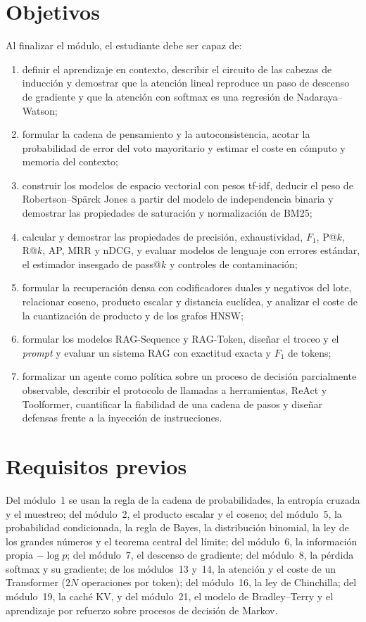 \documentclass[11pt,a4paper,twoside,openany]{book}
\begin{document}
\section*{Objetivos}
Al finalizar el módulo, el estudiante debe ser capaz de:
\begin{enumerate}[label=\arabic*.]
  \item definir el aprendizaje en contexto, describir el circuito de las cabezas de inducción y demostrar que la atención lineal reproduce un paso de descenso de gradiente y que la atención con softmax es una regresión de Nadaraya--Watson;
  \item formular la cadena de pensamiento y la autoconsistencia, acotar la probabilidad de error del voto mayoritario y estimar el coste en cómputo y memoria del contexto;
  \item construir los modelos de espacio vectorial con pesos tf-idf, deducir el peso de Robertson--Spärck Jones a partir del modelo de independencia binaria y demostrar las propiedades de saturación y normalización de BM25;
  \item calcular y demostrar las propiedades de precisión, exhaustividad, $F_1$, P@$k$, R@$k$, AP, MRR y nDCG, y evaluar modelos de lenguaje con errores estándar, el estimador insesgado de pass@$k$ y controles de contaminación;
  \item formular la recuperación densa con codificadores duales y negativos del lote, relacionar coseno, producto escalar y distancia euclídea, y analizar el coste de la cuantización de producto y de los grafos HNSW;
  \item formular los modelos RAG-Sequence y RAG-Token, diseñar el troceo y el \emph{prompt} y evaluar un sistema RAG con exactitud exacta y $F_1$ de tokens;
  \item formalizar un agente como política sobre un proceso de decisión parcialmente observable, describir el protocolo de llamadas a herramientas, ReAct y Toolformer, cuantificar la fiabilidad de una cadena de pasos y diseñar defensas frente a la inyección de instrucciones.
\end{enumerate}

\section*{Requisitos previos}
Del módulo~1 se usan la regla de la cadena de probabilidades, la entropía cruzada y el muestreo; del módulo~2, el producto escalar y el coseno; del módulo~5, la probabilidad condicionada, la regla de Bayes, la distribución binomial, la ley de los grandes números y el teorema central del límite; del módulo~6, la información propia $-\log p$; del módulo~7, el descenso de gradiente; del módulo~8, la pérdida softmax y su gradiente; de los módulos~13 y~14, la atención y el coste de un Transformer ($2N$ operaciones por token); del módulo~16, la ley de Chinchilla; del módulo~19, la caché KV, y del módulo~21, el modelo de Bradley--Terry y el aprendizaje por refuerzo sobre procesos de decisión de Markov.
\end{document}

